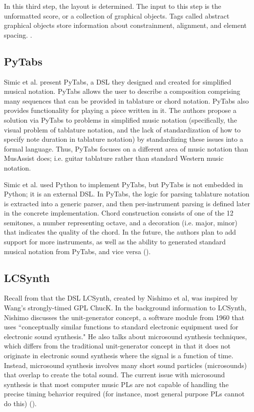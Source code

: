 \documentclass{report}
\newcommand\citeparen[1]{(\cite{#1})}
\begin{document}
In this third step, the layout is determined. The input to this step is the unformatted score, or a collection of graphical objects. Tags called abstract graphical objects store information about constrainment, alignment, and element spacing. 
\cite{nienhuys_nieuwenhuizen_2003}.


\subsection{PyTabs}
Simic et al. present  PyTabs, a  DSL  they designed and  created  for  simplified musical notation. PyTabs allows the user  to describe a composition comprising many  sequences that  can  be  provided in tablature or chord notation. PyTabs also provides functionality for playing a piece written in it. The authors propose a solution via PyTabs to problems in  simplified  music notation (specifically,  the  visual problem of  tablature  notation, and the lack of  standardization of how  to specify note duration in tablature notation) by  standardizing these issues into a formal language. Thus, PyTabs focuses on a different area of music notation than MusAssist does; i.e. guitar tablature rather than standard Western music notation.

Simic et al. used Python to  implement  PyTabs, but PyTabs is not  embedded  in  Python;  it is an external  DSL. In PyTabs, the  logic for parsing tablature  notation is extracted into a  generic parser, and then per-instrument parsing is defined  later in the concrete implementation. Chord construction consists  of one of the 12 semitones, a number representing  octave, and a decoration (i.e. major, minor) that indicates the quality of the  chord.  In the future, the authors plan to add support for more instruments, as  well as the ability to generated standard musical notation from PyTabs,  and  vice versa \citeparen{simic_bal_dejanovic_vaderna}.

\subsection{LCSynth}
Recall from  that the DSL LCSynth, created by Nishimo et al, was inspired by Wang's strongly-timed GPL ChucK. In  the background information to LCSynth, Nishimo discusses the unit-generator concept, a  software module from 1960  that uses ``conceptually similar functions to standard electronic equipment used for electronic sound synthesis." He also talks about microsound  synthesis techniques, which differs from the traditional unit-generator concept in that it does not  originate in electronic sound synthesis where  the signal is a function  of time. Instead, microsound synthesis involves many short sound particles (microsounds) that overlap to create the total sound. The  current issue with microsound synthesis is that most  computer music PLs are not  capable of handling the precise  timing behavior required  (for  instance,  most general purpose PLs  cannot do this) \citeparen{nishino_2012}.
\end{document}
